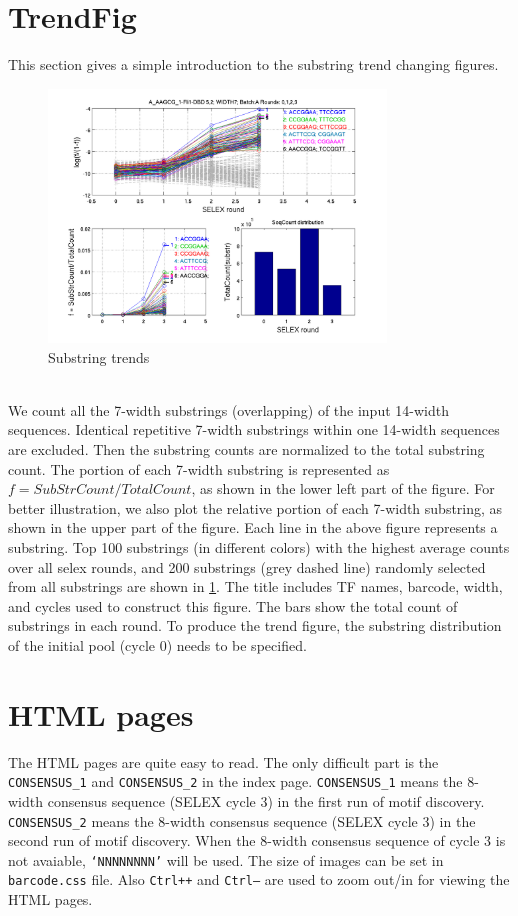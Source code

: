 \documentclass[a4paper,10pt]{article}
\begin{document}
\section{TrendFig}
This section gives a simple introduction to the substring trend changing figures.
  \begin{figure}[htp]
   \centering
   \includegraphics[width=0.8\textwidth]{a.png}
   \caption{Substring trends}
   \label{fig:trendfig}
  \end{figure} \\
We count all the 7-width substrings (overlapping) of the input 14-width sequences.
Identical repetitive 7-width substrings within one 14-width sequences are excluded.
Then the substring counts are normalized to the total substring count.
The portion of each 7-width substring is represented as $f = SubStrCount/TotalCount$, as shown in the lower left part of the figure.
For better illustration, we also plot the relative portion of each 7-width substring, as shown in the upper part of the figure.
Each line in the above figure represents a substring. 
Top 100 substrings (in different colors) with the highest average counts over all selex rounds, 
and 200 substrings (grey dashed line) randomly selected from all substrings are shown in \figurename{} \ref{fig:trendfig}.
The title includes TF names, barcode, width, and cycles used to construct this figure.
The bars show the total count of substrings in each round.
To produce the trend figure, the substring distribution of the initial pool (cycle 0) needs to be specified.



\section{HTML pages}
The HTML pages are quite easy to read.
The only difficult part is the \texttt{CONSENSUS\_1} and \texttt{CONSENSUS\_2} in the index page.
\texttt{CONSENSUS\_1} means the 8-width consensus sequence (SELEX cycle 3) in the first run of motif discovery.
\texttt{CONSENSUS\_2} means the 8-width consensus sequence (SELEX cycle 3) in the second run of motif discovery.
When the 8-width consensus sequence of cycle 3 is not avaiable, \texttt{`NNNNNNNN'} will be used. 
The size of images can be set in \texttt{barcode.css} file. Also \texttt{Ctrl++} and \texttt{Ctrl--} are used to zoom out/in for viewing the HTML pages.
\end{document}
